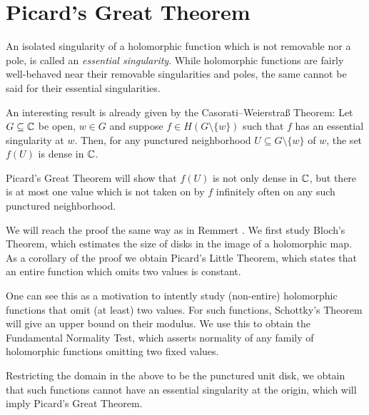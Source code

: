 \chapter{Picard's Great Theorem}
\label{ch:picards-great-theorem}

An isolated singularity of a holomorphic function which is not removable nor a pole, is called an \emph{essential singularity}. While holomorphic functions are fairly well-behaved near their removable singularities and poles, the same cannot be said for their essential singularities.

An interesting result is already given by the Casorati--Weierstraß Theorem: Let $G \subseteq \mathbb{C}$ be open, $w \in G$ and suppose $f \in H(G \setminus \{ w \})$ such that $f$ has an essential singularity at $w$. Then, for any punctured neighborhood $U \subseteq G \setminus \{ w \}$ of $w$, the set $f(U)$ is dense in $\mathbb{C}$.

Picard's Great Theorem will show that $f(U)$ is not only dense in $\mathbb{C}$, but there is at most one value which is not taken on by $f$ infinitely often on any such punctured neighborhood.

We will reach the proof the same way as in Remmert \cite{remmert-function-theory}. We first study Bloch's Theorem, which estimates the size of disks in the image of a holomorphic map. As a corollary of the proof we obtain Picard's Little Theorem, which states that an entire function which omits two values is constant.

One can see this as a motivation to intently study (non-entire) holomorphic functions that omit (at least) two values. For such functions, Schottky's Theorem will give an upper bound on their modulus. We use this to obtain the Fundamental Normality Test, which asserts normality of any family of holomorphic functions omitting two fixed values.

Restricting the domain in the above to be the punctured unit disk, we obtain that such functions cannot have an essential singularity at the origin, which will imply Picard's Great Theorem.




